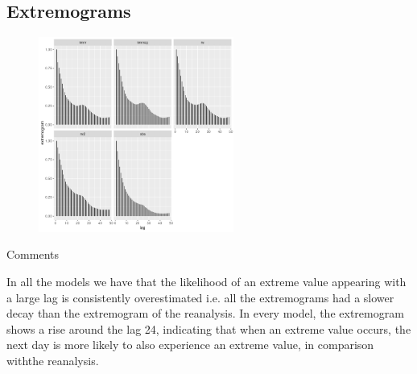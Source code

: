 \documentclass[xcolor=dvipsnames]{beamer}
\begin{document}
    \subsection{Extremograms}
    \begin{frame}{}
        \begin{figure}
            \centering
                 \includegraphics[width=0.57\textwidth]{images/extremograms.png}
       \end{figure}
    \end{frame}
    \begin{frame}{Comments}
        \begin{outline}
            \1 In all the models we have that the likelihood of an extreme value appearing with a large lag is consistently overestimated i.e. all the extremograms had a slower decay than the extremogram of the reanalysis.
            \1 In every model, the extremogram shows a rise around the lag 24, indicating that when an extreme value occurs, the next day is more likely to also experience an extreme value, in comparison withthe reanalysis.
        \end{outline}
    \end{frame}    
\end{document}
